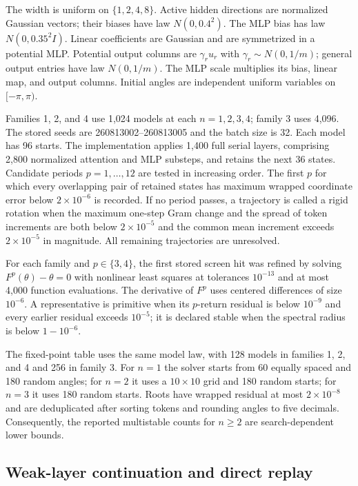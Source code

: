 \documentclass[11pt,a4paper]{article}
\theoremstyle{definition}
\begin{document}
The width is uniform on $\{1,2,4,8\}$.  Active hidden directions are normalized
Gaussian vectors; their biases have law $N(0,0.4^2)$.  The MLP bias has law
$N(0,0.35^2I)$.  Linear coefficients are Gaussian and are symmetrized in a potential
MLP.  Potential output columns are $\gamma_ru_r$ with
$\gamma_r\sim N(0,1/m)$; general output entries have law $N(0,1/m)$.  The MLP scale
multiplies its bias, linear map, and output columns.  Initial angles are independent
uniform variables on $[-\pi,\pi)$.

Families 1, 2, and 4 use 1,024 models at each $n=1,2,3,4$; family 3 uses 4,096.
The stored seeds are 260813002--260813005 and the batch size is 32.  Each model has 96
starts.  The implementation applies 1,400 full serial layers, comprising 2,800
normalized attention and MLP substeps, and retains the next 36 states.  Candidate periods
$p=1,\ldots,12$ are tested in increasing order.  The first $p$ for which every
overlapping pair of retained states has maximum wrapped coordinate error below
$2\times10^{-6}$ is recorded.  If no period passes, a trajectory is called a rigid
rotation when the maximum one-step Gram change and the spread of token increments are
both below $2\times10^{-5}$ and the common mean increment exceeds
$2\times10^{-5}$ in magnitude.  All remaining trajectories are unresolved.

For each family and $p\in\{3,4\}$, the first stored screen hit was refined by solving
$F^p(\theta)-\theta=0$ with nonlinear least squares at tolerances $10^{-13}$ and at
most 4,000 function evaluations.  The derivative of $F^p$ uses centered differences
of size $10^{-6}$.  A representative is primitive when its $p$-return residual is
below $10^{-9}$ and every earlier residual exceeds $10^{-5}$; it is declared stable
when the spectral radius is below $1-10^{-6}$.

The fixed-point table uses the same model law, with 128 models in families 1, 2, and
4 and 256 in family 3.  For $n=1$ the solver starts from 60 equally spaced and 180
random angles; for $n=2$ it uses a $10\times10$ grid and 180 random starts; for
$n=3$ it uses 180 random starts.  Roots have wrapped residual at most $2\times10^{-8}$
and are deduplicated after sorting tokens and rounding angles to five decimals.
Consequently, the reported multistable counts for $n\geq2$ are search-dependent lower
bounds.

\subsection{Weak-layer continuation and direct replay}
\end{document}
